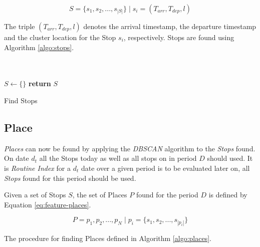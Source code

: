\begin{equation}
\label{eq:feature-stops}
S = \{s_1, s_2, ..., s_{|S|}\} \;| \; s_i = (T_{arr}, T_{dep}, l)
\end{equation}

The triple $(T_{arr}, T_{dep}, l)$ denotes the arrival timestamp, the departure timestamp and the cluster location for the Stop $s_i$, respectively. Stops are found using Algorithm \ref{algo:stops}.

\begin{algorithm}[H]
\SetAlgoLined
{}\\
\\

 $S \leftarrow \{ \}$\;
 \textbf{return} $S$\;
 \label{algo:stops}
 \caption{Find Stops}
\end{algorithm}

\subsection{Place}
\textit{Places} can now be found by applying the \textit{DBSCAN} algorithm to the \textit{Stops} found. On date $d_t$ all the Stops today as well as all stops on in period $D$ should used. It is \textit{Routine Index} for a $d_t$ date over a given period is to be evaluated later on, all \textit{Stops} found for this period should be used. 

Given a set of Stops $S$, the set of Places $P$ found for the period $D$ is defined by Equation \eqref{eq:feature-places}.

\begin{equation}
\label{eq:feature-places}
P = {p_1, p_2, ..., p_N} \;|\; p_i = \{s_1, s_2, ..., s_{|p_i|}\}
\end{equation}

The procedure for finding Places defined in Algorithm \ref{algo:places}.

